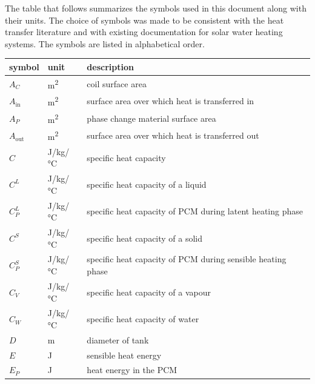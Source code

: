\documentclass[12pt]{article}
\begin{document}
The table that follows summarizes the symbols used in this document along with
their units.  The choice of symbols was made to be consistent with the heat
transfer literature and with existing documentation for solar water heating
systems.  The symbols are listed in alphabetical order.

\renewcommand{\arraystretch}{1.2}
\noindent \begin{longtable*}{l l p{12cm}} \toprule
  \textbf{symbol} & \textbf{unit} & \textbf{description}\\
  \midrule 
  $A_C$ & \si[per-mode=symbol] {\square\metre} & coil surface area
  \\
  $A_\text{in}$ & \si[per-mode=symbol] {\square\metre} & surface area over 
  which heat is transferred in
  \\ 
  $A_P$ & \si[per-mode=symbol] {\square\metre} & phase change material surface
  area
  \\
  $A_\text{out}$ & \si[per-mode=symbol] {\square\metre} & surface area over 
  which heat is transferred out
  \\ 
  $C$ & \si[per-mode=symbol] {\joule\per \kilogram\per \celsius} &
  specific heat capacity
  \\
  $C^L$ & \si[per-mode=symbol] {\joule\per\kilo\gram\per\celsius} & specific 
  heat capacity of a liquid 
  \\ 
  $C^L_P$ & \si[per-mode=symbol] {\joule\per \kilogram\per \celsius} & specific
  heat capacity of PCM during latent heating phase
  \\
  $C^S$ & \si[per-mode=symbol] {\joule\per\kilo\gram\per\celsius} & specific 
  heat capacity of a solid
  \\
  $C^S_P$ & \si[per-mode=symbol] {\joule\per \kilogram\per \celsius} & specific
  heat capacity of PCM during sensible heating phase
  \\
  $C_V$ & \si[per-mode=symbol] {\joule\per \kilogram\per \celsius} & specific
  heat capacity of a vapour
  \\
  $C_W$ & \si[per-mode=symbol] {\joule\per \kilogram\per \celsius} & specific
  heat capacity of water
  \\  
  $D$ & \si{\metre} & diameter of tank
  \\
  $E$ & \si[per-mode=symbol] {\joule} & sensible heat energy
  \\
  $E_P$ & \si[per-mode=symbol] {\joule} & heat energy in the PCM
  \\ 

\end{longtable*}
\end{document}
